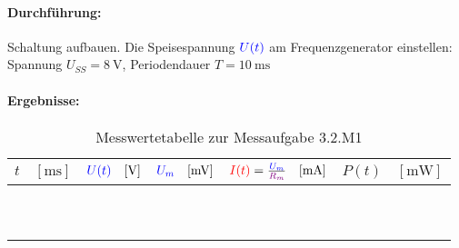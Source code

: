 \documentclass[11pt,a4paper,titlepage,parskip=half]{scrreprt}
\begin{document}
                    \paragraph{Durchführung:} Schaltung aufbauen. Die Speisespannung $\textcolor{blue}{U(t)}$ am Frequenzgenerator einstellen: Spannung $U_{SS} = \SI{8}{\volt}$, Periodendauer  $T = \SI{10}{\milli\second}$ 
                    \paragraph{Ergebnisse:}
                        \begin{center}
                            \begin{table}[H]
                                \caption{Messwertetabelle zur Messaufgabe 3.2.M1}
                                \label{tbl:messergebnisse3.1}
                                \renewcommand{\arraystretch}{1.6}
                                \begin{center}
                                    \begin{tabular}{c|c|c|c|c}
  										 $t \quad [\si{\milli\second}]$ & $\textcolor{blue}{U(t)}\quad  [\si{\volt}]$ & $\textcolor{blue}{U_m} \quad [\si{\milli\volt}]$ & $\textcolor{red}{I(t)} = \frac{\textcolor{blue}{U_m}}{\textcolor{violet}{R_m}}  \quad[\si{\milli\ampere}]$ & $P(t) \quad [\si{\milli\watt}]$\\ \hline
   										 \qquad\qquad\qquad& \qquad\qquad\qquad & \qquad\qquad\qquad & \qquad\qquad\qquad  & \qquad\qquad\qquad\\\hline
   										 &  &  &  & \\\hline
   										 &  &  &  & \\\hline
   										 &  &  &  & \\\hline
  										 &  &  &  & \\\hline
   										 &  &  &  & \\\hline
   										 &  &  &  & \\\hline
   										 &  &  &  & \\\hline
   										 &  &  &  & \\\hline
   										 &  &  &  & \\
									\end{tabular}
                                \end{center}
                            \end{table}
                        \end{center}
                    
\end{document}
